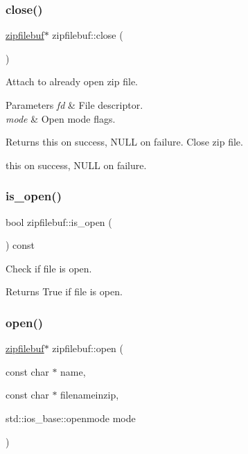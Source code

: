 \subsubsection{\texorpdfstring{close()}{close()}}
{\footnotesize\ttfamily \hyperlink{classzipfilebuf}{zipfilebuf}$\ast$ zipfilebuf\+::close (\begin{DoxyParamCaption}{ }\end{DoxyParamCaption})}



Attach to already open zip file. 


\begin{DoxyParams}{Parameters}
{\em fd} & File descriptor. \\
\hline
{\em mode} & Open mode flags. \\
\hline
\end{DoxyParams}
\begin{DoxyReturn}{Returns}
{\ttfamily this} on success, N\+U\+LL on failure. Close zip file. 

{\ttfamily this} on success, N\+U\+LL on failure. 
\end{DoxyReturn}
\mbox{\label{classzipfilebuf_a7563b8596d1b48825f1cb097a3859972}} 
\subsubsection{\texorpdfstring{is\+\_\+open()}{is\_open()}}
{\footnotesize\ttfamily bool zipfilebuf\+::is\+\_\+open (\begin{DoxyParamCaption}{ }\end{DoxyParamCaption}) const\hspace{0.3cm}{\ttfamily [inline]}}



Check if file is open. 

\begin{DoxyReturn}{Returns}
True if file is open. 
\end{DoxyReturn}
\mbox{\label{classzipfilebuf_a92684f54693ebbc9eff315fe0e9350ad}} 
\subsubsection{\texorpdfstring{open()}{open()}}
{\footnotesize\ttfamily \hyperlink{classzipfilebuf}{zipfilebuf}$\ast$ zipfilebuf\+::open (\begin{DoxyParamCaption}\item[{const char $\ast$}]{name,  }\item[{const char $\ast$}]{filenameinzip,  }\item[{std\+::ios\+\_\+base\+::openmode}]{mode }\end{DoxyParamCaption})}



